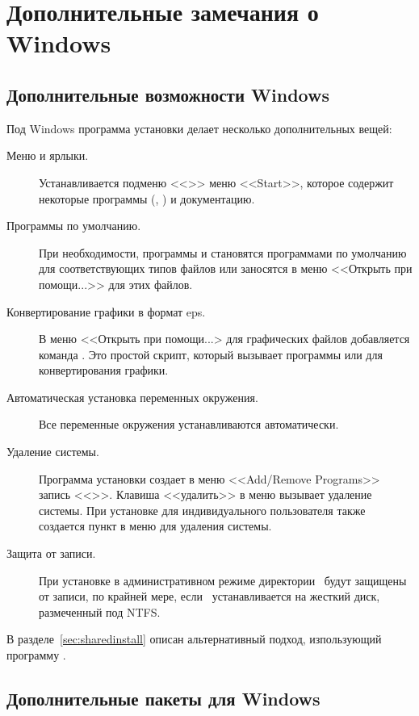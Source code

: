 \documentclass{article}
\begin{document}
\section{Дополнительные замечания о Windows}
\label{sec:windows}


\subsection{Дополнительные возможности Windows}
\label{sec:winfeatures}

Под Windows программа установки делает несколько дополнительных вещей:
\begin{description}
\item[Меню и ярлыки.] Устанавливается подменю <<\TL{}>> меню
  <<Start>>, которое содержит некоторые программы (,
  ) и документацию.
\item[Программы по умолчанию.]  При необходимости, программы
   и  становятся
  программами по умолчанию для соответствующих типов файлов или
  заносятся в меню <<Открыть при помощи...>> для этих файлов.
\item[Конвертирование графики в формат eps.] В меню <<Открыть при
  помощи...> для графических файлов добавляется команда
  .  Это простой скрипт, который вызывает
  программы  или   для конвертирования
  графики. 
\item[Автоматическая установка переменных окружения.] Все переменные
  окружения устанавливаются автоматически.
\item[Удаление системы.] Программа установки создает в меню
  <<Add/Remove Programs>> запись <<\TL{}>>.  Клавиша <<удалить>> в
  меню  вызывает удаление системы.  При установке для
  индивидуального пользователя также создается пункт в меню для
  удаления системы.
\item[Защита от записи.] При установке в административном режиме
  директории \TL\ будут защищены от записи, по крайней
  мере, если \TL\ устанавливается на жесткий диск, размеченный под
  NTFS.  
\end{description}

В разделе~\ref{sec:sharedinstall} описан альтернативный подход,
изпользующий программу .  



\subsection{Дополнительные пакеты для Windows}
\end{document}
